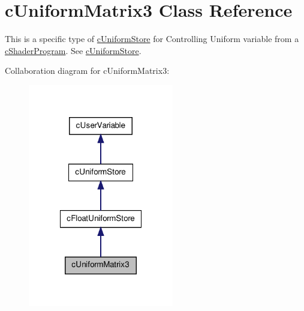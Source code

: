 \hypertarget{classc_uniform_matrix3}{
\section{cUniformMatrix3 Class Reference}
\label{classc_uniform_matrix3}
}


This is a specific type of \hyperlink{classc_uniform_store}{cUniformStore} for Controlling Uniform variable from a \hyperlink{classc_shader_program}{cShaderProgram}. See \hyperlink{classc_uniform_store}{cUniformStore}.  




Collaboration diagram for cUniformMatrix3:\nopagebreak
\begin{figure}[H]
\begin{center}
\leavevmode
\includegraphics[width=180pt]{classc_uniform_matrix3__coll__graph}
\end{center}
\end{figure}

